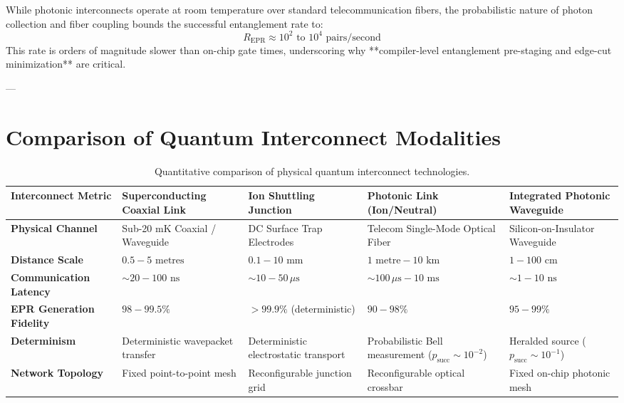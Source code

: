 While photonic interconnects operate at room temperature over standard telecommunication fibers, the probabilistic nature of photon collection and fiber coupling bounds the successful entanglement rate to:
\begin{equation}
    R_{\text{EPR}} \approx 10^2\text{ to }10^4\text{ pairs/second}
\end{equation}
This rate is orders of magnitude slower than on-chip gate times, underscoring why **compiler-level entanglement pre-staging and edge-cut minimization** are critical.

---

\section{Comparison of Quantum Interconnect Modalities}

\begin{table}[htbp]
\centering
\small
\begin{tabularx}{\textwidth}{l X X X X}
\toprule
\textbf{Interconnect Metric} & \textbf{Superconducting Coaxial Link} & \textbf{Ion Shuttling Junction} & \textbf{Photonic Link (Ion/Neutral)} & \textbf{Integrated Photonic Waveguide} \\
\midrule
\textbf{Physical Channel} & Sub-20 mK Coaxial / Waveguide & DC Surface Trap Electrodes & Telecom Single-Mode Optical Fiber & Silicon-on-Insulator Waveguide \\
\addlinespace
\textbf{Distance Scale} & $0.5 - 5\text{ metres}$ & $0.1 - 10\text{ mm}$ & $1\text{ metre} - 10\text{ km}$ & $1 - 100\text{ cm}$ \\
\addlinespace
\textbf{Communication Latency} & $\sim 20 - 100\text{ ns}$ & $\sim 10 - 50\,\mu\text{s}$ & $\sim 100\,\mu\text{s} - 10\text{ ms}$ & $\sim 1 - 10\text{ ns}$ \\
\addlinespace
\textbf{EPR Generation Fidelity} & $98 - 99.5\%$ & $>99.9\%$ (deterministic) & $90 - 98\%$ & $95 - 99\%$ \\
\addlinespace
\textbf{Determinism} & Deterministic wavepacket transfer & Deterministic electrostatic transport & Probabilistic Bell measurement ($p_{\text{succ}} \sim 10^{-2}$) & Heralded source ($p_{\text{succ}} \sim 10^{-1}$) \\
\addlinespace
\textbf{Network Topology} & Fixed point-to-point mesh & Reconfigurable junction grid & Reconfigurable optical crossbar & Fixed on-chip photonic mesh \\
\bottomrule
\end{tabularx}
\caption{Quantitative comparison of physical quantum interconnect technologies.}
\label{tab:interconnect_comparison}
\end{table}

